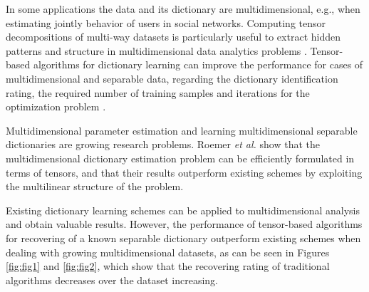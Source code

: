 \documentclass{article}
\begin{document}

In some applications the data and its dictionary are multidimensional, e.g., when estimating jointly behavior of users in social networks. Computing tensor decompositions of multi-way datasets is particularly useful to extract hidden patterns and structure in multidimensional data analytics problems \cite{kolda2009tensor}. Tensor-based algorithms for dictionary learning can improve the performance for cases of multidimensional and separable data, regarding the dictionary identification rating, the required number of training samples and iterations for the optimization problem \cite{roemer2014tensor}. 

Multidimensional parameter estimation and learning multidimensional separable dictionaries are growing research problems. Roemer \emph{et al.} \cite{roemer2014tensor} show that the multidimensional dictionary estimation problem can be efficiently formulated in terms of tensors, and that their results outperform existing schemes by exploiting the multilinear structure of the problem.

Existing dictionary learning schemes can be applied to multidimensional analysis and obtain valuable results. However, the performance of tensor-based algorithms for recovering of a known separable dictionary outperform existing schemes when dealing with growing multidimensional datasets, as can be seen in Figures \ref{fig:fig1} and \ref{fig:fig2}, which show that the recovering rating of traditional algorithms decreases over the dataset increasing.
\end{document}
